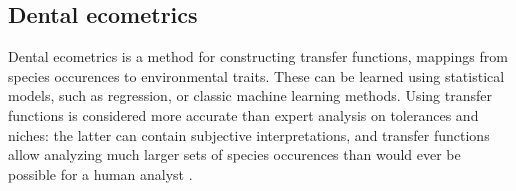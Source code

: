 \documentclass{article}
\begin{document}
\subsection{Dental ecometrics}
\label{sect:ecometrics}

Dental ecometrics is a method for constructing transfer functions, mappings from species occurences to environmental traits.
These can be learned using statistical models, such as regression, or classic machine learning methods.
Using transfer functions is considered more accurate than expert analysis on tolerances and niches: the latter
can contain subjective interpretations, and transfer functions allow analyzing much larger sets of species occurences than would 
ever be possible for a human analyst \cite{Faith_Lyman_2019}.
\end{document}
